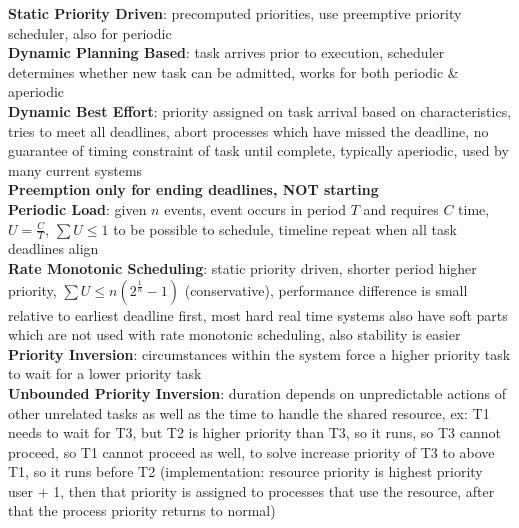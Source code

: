 \documentclass[a4paper]{article}
\begin{document}
\begin{multicols}{2}
        \textbf{Static Priority Driven}: precomputed priorities, use preemptive priority scheduler, also for periodic\\
        \textbf{Dynamic Planning Based}: task arrives prior to execution, scheduler determines whether new task can be admitted, works for both periodic \& aperiodic\\
        \textbf{Dynamic Best Effort}: priority assigned on task arrival based on characteristics, tries to meet all deadlines, abort processes which have missed the deadline, no guarantee of timing constraint of task until complete, typically aperiodic, used by many current systems\\
        \textbf{Preemption only for ending deadlines, NOT starting}\\
        \textbf{Periodic Load}: given $n$ events, event occurs in period $T$ and requires $C$ time, $U = \frac{C}{T}$, $\sum U \leq 1$ to be possible to schedule, timeline repeat when all task deadlines align\\
        \textbf{Rate Monotonic Scheduling}: static priority driven, shorter period higher priority, $\sum U \leq n(2^{\frac{1}{n}}-1)$ (conservative), performance difference is small relative to earliest deadline first, most hard real time systems also have soft parts which are not used with rate monotonic scheduling, also stability is easier\\
        \textbf{Priority Inversion}: circumstances within the system force a higher priority task to wait for a lower priority task\\
        \textbf{Unbounded Priority Inversion}: duration depends on unpredictable actions of other unrelated tasks as well as the time to handle the shared resource, ex: T1 needs to wait for T3, but T2 is higher priority than T3, so it runs, so T3 cannot proceed, so T1 cannot proceed as well, to solve increase priority of T3 to above T1, so it runs before T2 (implementation: resource priority is highest priority user + 1, then that priority  is assigned to processes that use the resource, after that the process priority returns to normal)\\
    \end{multicols}
    
\end{document}

